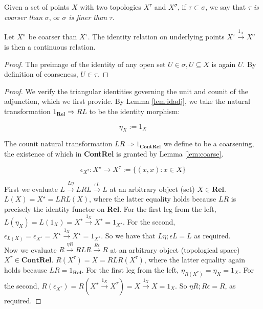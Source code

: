 \begin{rem}
Given a set of points $X$ with two topologies $X^\tau$ and $X^\sigma$, if $\tau \subset \sigma$, we say that $\tau$ \emph{is coarser than} $\sigma$, or $\sigma$ \emph{is finer than} $\tau$.
\end{rem}

\begin{lemma}\label{lem:coarse}
Let $X^\sigma$ be coarser than $X^\tau$. The identity relation on underlying points $X^\tau \overset{1_X}{\rightarrow} X^\sigma$ is then a continuous relation.
\begin{proof}
The preimage of the identity of any open set $U \in \sigma, U \subseteq X$ is again $U$. By definition of coarseness, $U \in \tau$.
\end{proof}
\end{lemma}

\begin{proposition}[$L \dashv R$]\label{prop:reladj}
\begin{proof}
We verify the triangular identities governing the unit and counit of the adjunction, which we first provide. By Lemma \ref{lem:idadj}, we take the natural transformation $1_\mathbf{Rel} \Rightarrow RL$ to be the identity morphism:

\[\eta_{X} := 1_{X}\]

The counit natural transformation $LR \Rightarrow 1_{\mathbf{ContRel}}$ we define to be a coarsening, the existence of which in \textbf{ContRel} is granted by Lemma \ref{lem:coarse}.

\[\epsilon_{X^\tau} : X^\star \rightarrow X^\tau := \{(x,x) : x \in X\}\]

First we evaluate $L \overset{L\eta}{\rightarrow} LRL \overset{\epsilon L}{\rightarrow} L$ at an arbitrary object (set) $X \in \textbf{Rel}$. $L(X) = X^\star = LRL(X)$, where the latter equality holds because $LR$ is precisely the identity functor on \textbf{Rel}. For the first leg from the left, $L(\eta_X) = L(1_X) = X^\star \overset{1_X}{\rightarrow} X^\star = 1_{X^\star}$. For the second, $\epsilon_{L(X)} = \epsilon_{X^\star} = X^\star \overset{1_X}{\rightarrow} X^\star = 1_{X^\star}$. So we have that $L\eta ; \epsilon L = L$ as required.\\

Now we evaluate $R \overset{\eta R}{\rightarrow} RLR \overset{R \epsilon}{\rightarrow} R$ at an arbitrary object (topological space) $X^\tau \in \textbf{ContRel}$. $R(X^\tau) = X = RLR(X^\tau)$, where the latter equality again holds because $LR = 1_\textbf{Rel}$. For the first leg from the left, $\eta_{R(X^\tau)} = \eta_X = 1_{X}$. For the second, $R(\epsilon_{X^\tau}) = R(X^\star \overset{1_X}{\rightarrow} X^\tau) = X \overset{1_X}{\rightarrow} X = 1_X$. So $\eta R ; R \epsilon = R$, as required.
\end{proof}
\end{proposition}

